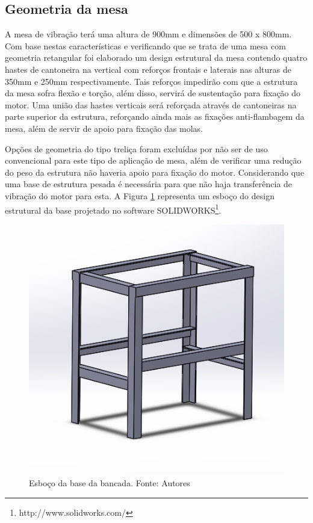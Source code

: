 \subsection*{\textbf{Geometria da mesa}}

  A mesa de vibração terá uma altura de 900mm e dimensões de 500 x 800mm. Com base nestas características e verificando que se trata de uma mesa com geometria retangular foi elaborado um design estrutural da mesa contendo quatro hastes de cantoneira na vertical com reforços frontais e laterais nas alturas de 350mm e 250mm respectivamente. Tais reforços impedirão com que a estrutura da mesa sofra flexão e torção, além disso, servirá de sustentação para fixação do motor. Uma união das hastes verticais será reforçada através de cantoneiras na parte superior da estrutura, reforçando ainda mais as fixações anti-flambagem da mesa, além de servir de apoio para fixação das molas.

    Opções de geometria do tipo treliça foram excluídas por não ser de uso convencional para este tipo de aplicação de mesa, além de verificar uma redução do peso da estrutura não haveria apoio para fixação do motor. Considerando que uma base de estrutura pesada é necessária para que não haja transferência de vibração do motor para esta. A Figura \ref{fig:base_bancada} representa um esboço do design estrutural da base projetado no software SOLIDWORKS\footnote{http://www.solidworks.com/}.

\begin{figure}[!ht]
\centering
\includegraphics[scale=0.5]{figuras/base_bancada.png}
\caption{Esboço da base da bancada. Fonte: Autores}
\label{fig:base_bancada}
\end{figure}

